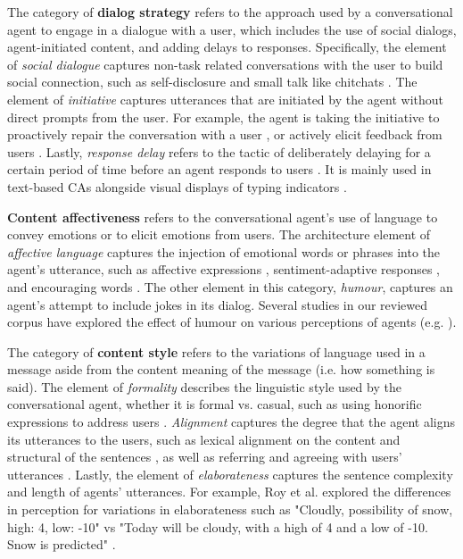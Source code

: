 The category of \textbf{dialog strategy} refers to the approach used by a conversational agent to engage in a dialogue with a user, which includes the use of social dialogs, agent-initiated content, and adding delays to responses. Specifically, the element of \textit{social dialogue} captures non-task related conversations with the user to build social connection, such as self-disclosure \cite{lee2020hear}\cmt{[23]} and small talk like chitchats \cite{lubold2016effects, volkel2021manipulating}\cmt{[86][68]}. The element of \textit{initiative} captures utterances that are initiated by the agent without direct prompts from the user. For example, the agent is taking the initiative to proactively repair the conversation with a user \cite{ashktorab2019resilient, cuadra2021my}\cmt{[88][67]}, or actively elicit feedback from users \cite{xiao2021let}\cmt{[73]}. Lastly, \textit{response delay} refers to the tactic of deliberately delaying for a certain period of time before an agent responds to users \cite{gnewuch2018faster, gnewuch2022opposing}\cmt{[19][20]}. It is mainly used in text-based CAs alongside visual displays of typing indicators \cite{gnewuch2018chatbot}\cmt{[21]}.

\textbf{Content affectiveness} refers to the conversational agent's use of language to convey emotions or to elicit emotions from users. The architecture element of \textit{affective language} captures the injection of emotional words or phrases into the agent's utterance, such as affective expressions \cite{seeger2021chatbots, yang2017perceived, zhu2022effects}\cmt{[35][44][26]}, sentiment-adaptive responses \cite{diederich2019emulating}\cmt{[25]}, and encouraging words \cite{healey2013relating}\cmt{[39]}. The other element in this category, \textit{humour}, captures an agent's attempt to include jokes in its dialog. Several studies in our reviewed corpus have explored the effect of humour on various perceptions of agents (e.g. \cite{ceha2021can, khooshabeh2011does}\cmt{[57][37]}).

The category of \textbf{content style} refers to the variations of language used in a message aside from the content meaning of the message (i.e. how something is said). The element of \textit{formality} describes the linguistic style used by the conversational agent, whether it is formal vs. casual, such as using honorific expressions to address users \cite{ouchi2019should}\cmt{[59]}. \textit{Alignment} captures the degree that the agent aligns its utterances to the users, such as lexical alignment on the content and structural of the sentences \cite{huiyang2022improving, linnemann2018can}\cmt{[17][15]}, as well as referring and agreeing with users' utterances \cite{volkel2021examining}\cmt{[69]}. Lastly, the element of \textit{elaborateness} captures the sentence complexity and length of agents' utterances. For example, Roy et al. explored the differences in perception for variations in elaborateness such as "Cloudly, possibility of snow, high: 4, low: -10" vs "Today will be cloudy, with a high of 4 and a low of -10. Snow is predicted" \cite{roy2021users}\cmt{[71]}.

